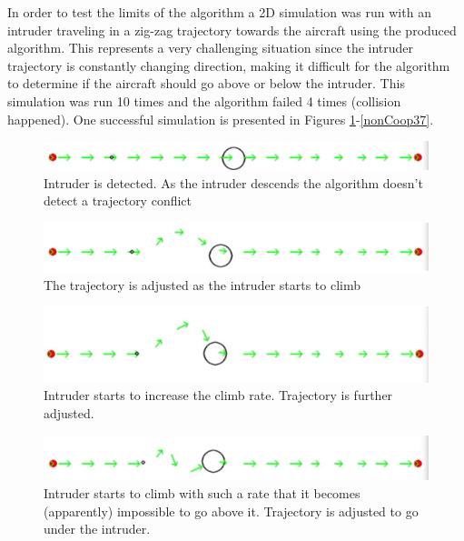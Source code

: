 In order to test the limits of the algorithm a 2D simulation was run with an intruder traveling in a zig-zag trajectory towards the aircraft using the produced algorithm. This represents a very challenging situation since the intruder trajectory is constantly changing direction, making it difficult for the algorithm to determine if the aircraft should go above or below the intruder. This simulation was run 10 times and the algorithm failed 4 times (collision happened). One successful simulation is presented in Figures \ref{nonCoop31}-\ref{nonCoop37}.


\begin{figure}[H]
    \centering
    \includegraphics[width=0.7\linewidth]{Figures/07_simulation/nonCoop3/nonCoop31.png}
    \caption{Intruder is detected. As the intruder descends the algorithm doesn't detect a trajectory conflict}
    \label{nonCoop31}
\end{figure}

\begin{figure}[H]
    \centering
    \includegraphics[width=0.7\linewidth]{Figures/07_simulation/nonCoop3/nonCoop32.png}
    \caption{The trajectory is adjusted as the intruder starts to climb}
    \label{nonCoop32}
\end{figure}

\begin{figure}[H]
    \centering
    \includegraphics[width=0.7\linewidth]{Figures/07_simulation/nonCoop3/nonCoop33.png}
    \caption{Intruder starts to increase the climb rate. Trajectory is further adjusted.}
    \label{nonCoop33}
\end{figure}

\begin{figure}[H]
    \centering
    \includegraphics[width=0.7\linewidth]{Figures/07_simulation/nonCoop3/nonCoop34.png}
    \caption{Intruder starts to climb with such a rate that it becomes (apparently) impossible to go above it. Trajectory is adjusted to go under the intruder.}
    \label{nonCoop34}
\end{figure}

